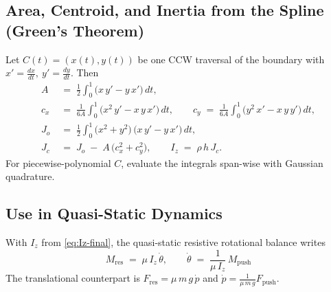 \documentclass[conference]{IEEEtran}
\begin{document}
\subsection{Area, Centroid, and Inertia from the Spline (Green's Theorem)}
\noindent Let $C(t)=(x(t),y(t))$ be one CCW traversal of the boundary with $x'=\tfrac{dx}{dt},\ y'=\tfrac{dy}{dt}$. Then
\begin{align}
A \;&=\; \frac{1}{2}\int_0^1 \big( x\,y' - y\,x' \big)\,dt, \label{eq:area}\\[2pt]
c_x \;&=\; \frac{1}{6A}\int_0^1 \big( x^2\,y' - x\,y\,x' \big)\,dt, \qquad
c_y \;=\; \frac{1}{6A}\int_0^1 \big( y^2\,x' - x\,y\,y' \big)\,dt, \label{eq:centroid}\\[2pt]
J_o \;&=\; \frac{1}{2}\int_0^1 \big(x^2+y^2\big)\,\big( x\,y' - y\,x' \big)\,dt, \label{eq:polar-origin}\\[2pt]
J_c \;&=\; J_o \;-\; A\,\big(c_x^2+c_y^2\big), \qquad
I_z \;=\; \rho\,h\,J_c. \label{eq:Iz-final}
\end{align}
For piecewise-polynomial $C$, evaluate the integrals span-wise with Gaussian quadrature.

\subsection{Use in Quasi-Static Dynamics}
\noindent With $I_z$ from \eqref{eq:Iz-final}, the quasi-static resistive rotational balance writes
\begin{equation}
M_{\mathrm{res}} \;=\; \mu\,I_z\,\dot{\theta},\qquad
\dot{\theta} \;=\; \frac{1}{\mu\,I_z}\,M_{\mathrm{push}}
\end{equation}
The translational counterpart is $F_{\mathrm{res}}=\mu\,m\,g\,\dot{p}$ and $\dot{p}=\tfrac{1}{\mu\,m\,g} F_{\mathrm{push}}$.
\end{document}
